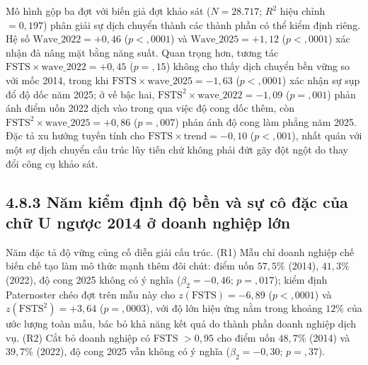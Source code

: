 \documentclass[
  a4paper,
  13pt]{extreport}
\begin{document}
Mô hình gộp ba đợt với biến giả đợt khảo sát (\(N = 28.717\); \(R^2\)
hiệu chỉnh \(= 0{,}197\)) phân giải sự dịch chuyển thành các thành phần
có thể kiểm định riêng. Hệ số \(\text{Wave}\_2022 = +0{,}46\)
(\(p < {,}0001\)) và \(\text{Wave}\_2025 = +1{,}12\) (\(p < {,}0001\))
xác nhận đà nâng mặt bằng năng suất. Quan trọng hơn, tương tác
\(\text{FSTS} \times \text{wave}\_2022 = +0{,}45\) (\(p = {,}15\)) không
cho thấy dịch chuyển bền vững so với mốc 2014, trong khi
\(\text{FSTS} \times \text{wave}\_2025 = -1{,}63\) (\(p < {,}0001\)) xác
nhận sự sụp đổ độ dốc năm 2025; ở vế bậc hai,
\(\text{FSTS}^2 \times \text{wave}\_2022 = -1{,}09\) (\(p = {,}001\))
phản ánh điểm uốn 2022 dịch vào trong qua việc độ cong dốc thêm, còn
\(\text{FSTS}^2 \times \text{wave}\_2025 = +0{,}86\) (\(p = {,}007\))
phản ánh độ cong làm phẳng năm 2025. Đặc tả xu hướng tuyến tính cho
\(\text{FSTS} \times \text{trend} = -0{,}10\) (\(p < {,}001\)), nhất
quán với một sự dịch chuyển cấu trúc lũy tiến chứ không phải đứt gãy đột
ngột do thay đổi công cụ khảo sát.

\hypertarget{nux103m-kiux1ec3m-ux111ux1ecbnh-ux111ux1ed9-bux1ec1n-vuxe0-sux1ef1-cuxf4-ux111ux1eb7c-cux1ee7a-chux1eef-u-ngux1b0ux1ee3c-2014-ux1edf-doanh-nghiux1ec7p-lux1edbn}{%
\subsection{4.8.3 Năm kiểm định độ bền và sự cô đặc của chữ U ngược 2014
ở doanh nghiệp
lớn}\label{nux103m-kiux1ec3m-ux111ux1ecbnh-ux111ux1ed9-bux1ec1n-vuxe0-sux1ef1-cuxf4-ux111ux1eb7c-cux1ee7a-chux1eef-u-ngux1b0ux1ee3c-2014-ux1edf-doanh-nghiux1ec7p-lux1edbn}}

Năm đặc tả độ vững củng cố diễn giải cấu trúc. (R1) Mẫu chỉ doanh nghiệp
chế biến chế tạo làm mô thức mạnh thêm đôi chút: điểm uốn \(57{,}5\%\)
(2014), \(41{,}3\%\) (2022), độ cong 2025 không có ý nghĩa
(\(\beta_2 = -0{,}46\); \(p = {,}017\)); kiểm định Paternoster chéo đợt
trên mẫu này cho \(z(\text{FSTS}) = -6{,}89\) (\(p < {,}0001\)) và
\(z(\text{FSTS}^2) = +3{,}64\) (\(p = {,}0003\)), với độ lớn hiệu ứng
nằm trong khoảng \(12\%\) của ước lượng toàn mẫu, bác bỏ khả năng kết
quả do thành phần doanh nghiệp dịch vụ. (R2) Cắt bỏ doanh nghiệp có FSTS
\(> 0{,}95\) cho điểm uốn \(48{,}7\%\) (2014) và \(39{,}7\%\) (2022), độ
cong 2025 vẫn không có ý nghĩa (\(\beta_2 = -0{,}30\); \(p = {,}37\)).
\end{document}
